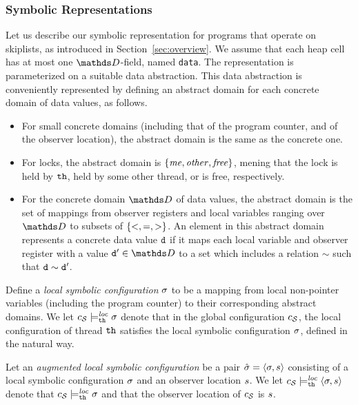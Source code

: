 \subsubsection*{Symbolic Representations}
Let us describe our symbolic representation for programs that
operate on skiplists, as introduced in Section~\ref{sec:overview}.
We assume that each heap cell has at most one $\ddomain$-field, named {\tt data}.
The representation is parameterized on a suitable data abstraction.
This data abstraction is conveniently represented by defining an
abstract domain for each concrete domain of data values, as follows.
\begin{itemize}
\item For small concrete domains (including that of the program counter, and
  of the observer location),
  the abstract domain is the same as the concrete one.
\item
  For locks, the abstract domain is $\left\{\mathit{me},\mathit{other},\mathit{free}\right\}$,
  mening that the lock is held by ${\tt th}$,  held by some other thread, or is
  free, respectively.
\item For the concrete domain $\ddomain$ of data values, the abstract domain
  is the set of mappings from observer registers and local variables
  ranging over $\ddomain$ to subsets of $\left\{<,=,>\right\}$.
  An element in this abstract domain represents a concrete data value $\tt d$
  if it maps each local variable and observer register with a value ${\tt d'} \in \ddomain$
  to a set which includes a relation $\sim$ such that $\tt d \sim \tt d'$.
\end{itemize}
Define a {\em local symbolic configuration} $\sigma$ to be
a mapping from local non-pointer
variables (including the program counter) to their corresponding abstract
domains.
We let $c_{\mathcal S} \models_{{\tt th}}^{\mathit{loc}} \sigma$ denote that in the
global configuration $c_{\mathcal S}$, the
local configuration of thread ${\tt th}$ satisfies the local symbolic
configuration $\sigma$, defined in the natural way.



Let an {\em augmented
local symbolic configuration} be a pair
$\hat{\sigma} = \left\langle\sigma,s\right\rangle$ consisting of
a local symbolic configuration $\sigma$ and an observer location $s$.
We let $c_{\mathcal S} \models_{{\tt th}}^{\mathit{loc}} \left\langle\sigma,s\right\rangle$ denote
that $c_{\mathcal S} \models_{{\tt th}}^{\mathit{loc}} \sigma$
and that the observer location of $c_{\mathcal S}$ is $s$.

